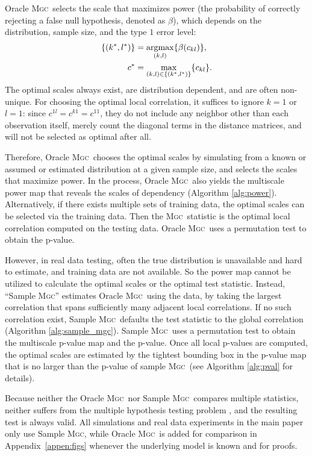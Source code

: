 \documentclass[11pt]{article}
\providecommand{\sct}[1]{{\normalfont\textsc{#1}}}
\newcommand{\GG}{c}
\newcommand{\Mgc}{\sct{Mgc}}
\newcommand{\argmax}{\operatornamewithlimits{argmax}}
\begin{document}
Oracle \Mgc~selects the scale that maximizes power (the probability of correctly rejecting a false null hypothesis, denoted as $\beta$), which depends on the distribution, sample size, and the type $1$ error level:
\begin{align*}
\{(k^{*},l^{*})\} &=\argmax_{(k,l)}\{\beta(\GG_{kl})\}, \\
\GG^{*} &=\max_{(k,l) \in \{(k^{*},l^{*})\}} \{\GG_{kl}\}. 
\end{align*}
The optimal scales always exist,  are distribution dependent, and are often non-unique. For choosing the optimal local correlation, it suffices to ignore $k=1$ or $l=1$: since $\GG^{1l}=\GG^{k1}=\GG^{11}$, they do not include any neighbor other than each observation itself, merely count the diagonal terms in the distance matrices, and will not be selected as optimal after all.

Therefore, Oracle \Mgc~chooses the optimal scales by simulating from a known or assumed or estimated distribution at a given sample size, and selects the scales that maximize power. In the process, Oracle \Mgc~also yields the multiscale power map that reveals the scales of dependency (Algorithm \ref{alg:power}). Alternatively, if there exists multiple sets of training data, the optimal scales can be selected via the training data. Then the \Mgc~statistic is the optimal local correlation computed on the testing data. Oracle \Mgc~uses a permutation test to obtain the p-value.

However, in real data testing, often the true distribution is unavailable and hard to estimate, and training data are not available. 
So the power map cannot be utilized to calculate the optimal scales or the optimal test statistic.
Instead,  ``Sample \Mgc''  estimates Oracle \Mgc~using the data, by taking the largest correlation that  spans sufficiently many adjacent local correlations. 
If no such correlation exist, Sample \Mgc~defaults the test statistic to the global correlation (Algorithm \ref{alg:sample_mgc}). 
Sample \Mgc~uses a permutation test to obtain the multiscale p-value map and the p-value. 
% 
Once all local p-values are computed, the optimal scales are estimated by the tightest bounding box in the p-value map that is no larger than the p-value of sample \Mgc~(see Algorithm \ref{alg:pval} for details).  

Because neither the Oracle \Mgc~nor Sample \Mgc~compares multiple statistics, neither suffers from the multiple hypothesis testing problem \cite{Benjamini1995}, and the resulting test is always valid. All simulations and real data experiments in the main paper only use Sample \Mgc, while Oracle \Mgc~is added for comparison in Appendix~\ref{appen:figs} whenever the underlying model is known and for proofs.
\end{document}
